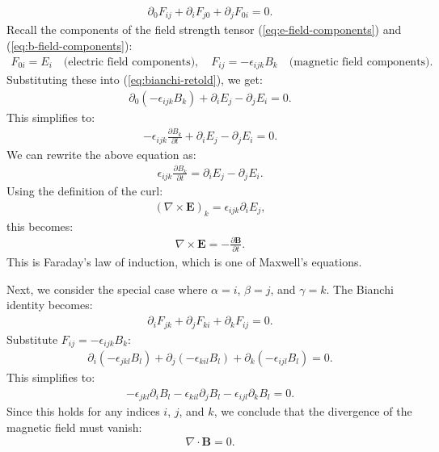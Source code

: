 \begin{enumerate}
\begin{align}
    \partial_0 F_{ij} + \partial_i F_{j0} + \partial_j F_{0i} = 0.\label{eq:bianchi-retold}
\end{align}
Recall the components of the field strength tensor (\ref{eq:e-field-components}) and (\ref{eq:b-field-components}):
\begin{align*}
    F_{0i} = E_i \quad \text{(electric field components)}, \quad F_{ij} = -\epsilon_{ijk} B_k \quad \text{(magnetic field components)}.
\end{align*}
Substituting these into (\ref{eq:bianchi-retold}), we get:
\begin{align*}
    \partial_0 (-\epsilon_{ijk} B_k) + \partial_i E_j - \partial_j E_i = 0.
\end{align*}
This simplifies to:
\begin{align*}
    -\epsilon_{ijk} \frac{\partial B_k}{\partial t} + \partial_i E_j - \partial_j E_i = 0.
\end{align*}
We can rewrite the above equation as:
\begin{align*}
    \epsilon_{ijk} \frac{\partial B_k}{\partial t} = \partial_i E_j - \partial_j E_i.
\end{align*}
Using the definition of the curl:
\begin{align*}
    (\nabla \times \mathbf{E})_k = \epsilon_{ijk} \partial_i E_j,
\end{align*}
this becomes:
\begin{align}
    \nabla \times \mathbf{E} = -\frac{\partial \mathbf{B}}{\partial t}.
\end{align}
This is Faraday’s law of induction, which is one of Maxwell’s equations.

Next, we consider the special case where $\alpha = i$, $\beta = j$, and $\gamma = k$. The Bianchi identity becomes:
\begin{align*}
    \partial_i F_{jk} + \partial_j F_{ki} + \partial_k F_{ij} = 0.
\end{align*}
Substitute $F_{ij} = -\epsilon_{ijk} B_k$:
\begin{align*}
    \partial_i (-\epsilon_{jkl} B_l) + \partial_j (-\epsilon_{kil} B_l) + \partial_k (-\epsilon_{ijl} B_l) = 0.
\end{align*}
This simplifies to:
\begin{align*}
    -\epsilon_{jkl} \partial_i B_l - \epsilon_{kil} \partial_j B_l - \epsilon_{ijl} \partial_k B_l = 0.
\end{align*}
Since this holds for any indices $i$, $j$, and $k$, we conclude that the divergence of the magnetic field must vanish:
\begin{align}
\nabla \cdot \mathbf{B} = 0.
\end{align}
\end{enumerate}
\bigskip\bigskip\hline\hline\bigskip